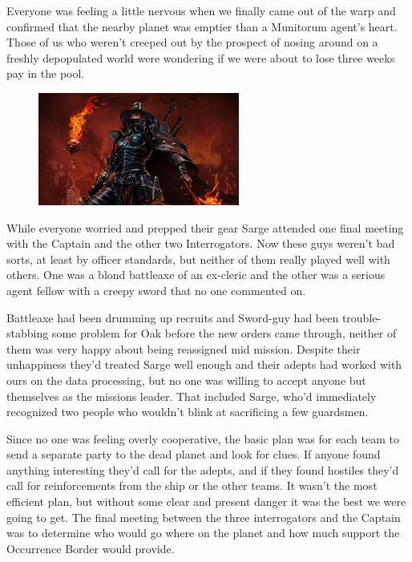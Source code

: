Everyone was feeling a little nervous when we finally came out of the warp and confirmed that the nearby planet was emptier than a Munitorum agent's heart. 
Those of us who weren't creeped out by the prospect of nosing around on a freshly depopulated world were wondering if we were about to lose three weeks pay in the pool. 


\begin{figure}
	\begin{center}
		\includegraphics[width=\figwidth]{pics/11/12.png}
	\end{center}
\end{figure}
While everyone worried and prepped their gear Sarge attended one final meeting with the Captain and the other two Interrogators. 
Now these guys weren't bad sorts, at least by officer standards, but neither of them really played well with others. 
One was a blond battleaxe of an ex-cleric and the other was a serious agent fellow with a creepy sword that no one commented on. 


Battleaxe had been drumming up recruits and Sword-guy had been trouble-stabbing some problem for Oak before the new orders came through, neither of them was very happy about being reassigned mid mission. 
Despite their unhappiness they'd treated Sarge well enough and their adepts had worked with ours on the data processing, but no one was willing to accept anyone but themselves as the missions leader. 
That included Sarge, who'd immediately recognized two people who wouldn't blink at sacrificing a few guardsmen.

Since no one was feeling overly cooperative, the basic plan was for each team to send a separate party to the dead planet and look for clues. 
If anyone found anything interesting they'd call for the adepts, and if they found hostiles they'd call for reinforcements from the ship or the other teams. 
It wasn't the most efficient plan, but without some clear and present danger it was the best we were going to get. 
The final meeting between the three interrogators and the Captain was to determine who would go where on the planet and how much support the Occurrence Border would provide.

